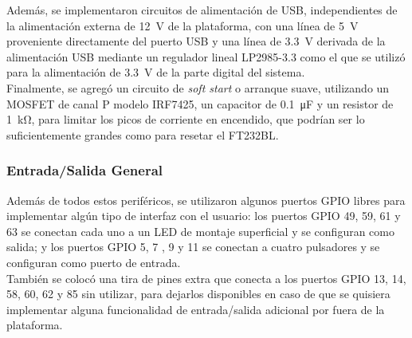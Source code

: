 Además, se implementaron circuitos de alimentación de USB, independientes de la alimentación externa de \SI[]{12}{\volt} de la plataforma, con una línea de \SI[]{5}{\volt} proveniente directamente del puerto USB y una línea de \SI[]{3.3}{\volt} derivada de la alimentación USB mediante un regulador lineal LP2985-3.3 como el que se utilizó para la alimentación de \SI[]{3.3}{\volt} de la parte digital del sistema.\\

Finalmente, se agregó un circuito de \textit{soft start} o arranque suave, utilizando un MOSFET de canal P modelo IRF7425, un capacitor de \SI[]{0.1}{\micro\farad} y un resistor de \SI[]{1}{\kilo\ohm}, para limitar los picos de corriente en encendido, que podrían ser lo suficientemente grandes como para resetar el FT232BL.\\

\subsubsection{Entrada/Salida General}

Además de todos estos periféricos, se utilizaron algunos puertos GPIO libres para implementar algún tipo de interfaz con el usuario: los puertos GPIO 49, 59, 61 y 63 se conectan cada uno a un LED de montaje superficial y se configuran como salida; y los puertos GPIO 5, 7 , 9 y 11 se conectan a cuatro pulsadores y se configuran como puerto de entrada.\\

También se colocó una tira de pines extra que conecta a los puertos GPIO 13, 14, 58, 60, 62 y 85 sin utilizar, para dejarlos disponibles en caso de que se quisiera implementar alguna funcionalidad de entrada/salida adicional por fuera de la plataforma.\\